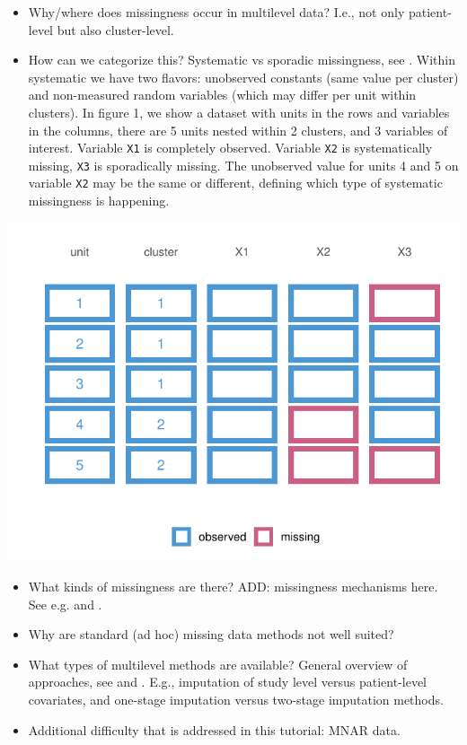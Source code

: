 \documentclass[
]{jss}
\begin{document}
\begin{itemize}
\item
  Why/where does missingness occur in multilevel data? I.e., not only
  patient-level but also cluster-level.
\item
  How can we categorize this? Systematic vs sporadic missingness, see
  \citet{resc13}. Within systematic we have two flavors: unobserved
  constants (same value per cluster) and non-measured random variables
  (which may differ per unit within clusters). In figure 1, we show a
  dataset with units in the rows and variables in the columns, there are
  5 units nested within 2 clusters, and 3 variables of interest.
  Variable \texttt{X1} is completely observed. Variable \texttt{X2} is
  systematically missing, \texttt{X3} is sporadically missing. The
  unobserved value for units 4 and 5 on variable \texttt{X2} may be the
  same or different, defining which type of systematic missingness is
  happening.
\end{itemize}

\begin{CodeChunk}


\begin{center}\includegraphics{Manuscript_files/figure-latex/patterns-1} \end{center}

\end{CodeChunk}

\begin{itemize}
\item
  What kinds of missingness are there? ADD: missingness mechanisms here.
  See e.g. \citet{yuce08} and \citet{hox15}.
\item
  Why are standard (ad hoc) missing data methods not well suited?
\item
  What types of multilevel methods are available? General overview of
  approaches, see \citet{audi18} and \citet{grun18}. E.g., imputation of
  study level versus patient-level covariates, and one-stage imputation
  versus two-stage imputation methods.
\item
  Additional difficulty that is addressed in this tutorial: MNAR data.
\end{itemize}
\end{document}
